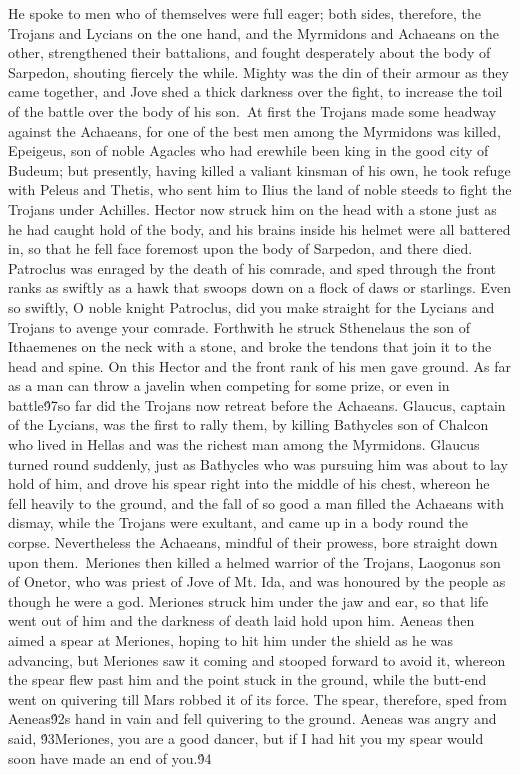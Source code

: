 {He spoke to men who of themselves were full eager; both sides, therefore, the Trojans and Lycians on the one hand, and the Myrmidons and Achaeans on the other, strengthened their battalions, and fought desperately about the body of Sarpedon, shouting fiercely the while. Mighty was the din of their armour as they came together, and Jove shed a thick darkness over the fight, to increase the toil of the battle over the body of his son.\
At first the Trojans made some headway against the Achaeans, for one of the best men among the Myrmidons was killed, Epeigeus, son of noble Agacles who had erewhile been king in the good city of Budeum; but presently, having killed a valiant kinsman of his own, he took refuge with Peleus and Thetis, who sent him to Ilius the land of noble steeds to fight the Trojans under Achilles. Hector now struck him on the head with a stone just as he had caught hold of the body, and his brains inside his helmet were all battered in, so that he fell face foremost upon the body of Sarpedon, and there died. Patroclus was enraged by the death of his comrade, and sped through the front ranks as swiftly as a hawk that swoops down on a flock of daws or starlings. Even so swiftly, O noble knight Patroclus, did you make straight for the Lycians and Trojans to avenge your comrade. Forthwith he struck Sthenelaus the son of Ithaemenes on the neck with a stone, and broke the tendons that join it to the head and spine. On this Hector and the front rank of his men gave ground. As far as a man can throw a javelin when competing for some prize, or even in battle\'97so far did the Trojans now retreat before the Achaeans. Glaucus, captain of the Lycians, was the first to rally them, by killing Bathycles son of Chalcon who lived in Hellas and was the richest man among the Myrmidons. Glaucus turned round suddenly, just as Bathycles who was pursuing him was about to lay hold of him, and drove his spear right into the middle of his chest, whereon he fell heavily to the ground, and the fall of so good a man filled the Achaeans with dismay, while the Trojans were exultant, and came up in a body round the corpse. Nevertheless the Achaeans, mindful of their prowess, bore straight down upon them.\
Meriones then killed a helmed warrior of the Trojans, Laogonus son of Onetor, who was priest of Jove of Mt. Ida, and was honoured by the people as though he were a god. Meriones struck him under the jaw and ear, so that life went out of him and the darkness of death laid hold upon him. Aeneas then aimed a spear at Meriones, hoping to hit him under the shield as he was advancing, but Meriones saw it coming and stooped forward to avoid it, whereon the spear flew past him and the point stuck in the ground, while the butt-end went on quivering till Mars robbed it of its force. The spear, therefore, sped from Aeneas\'92s hand in vain and fell quivering to the ground. Aeneas was angry and said, \'93Meriones, you are a good dancer, but if I had hit you my spear would soon have made an end of you.\'94\
}
